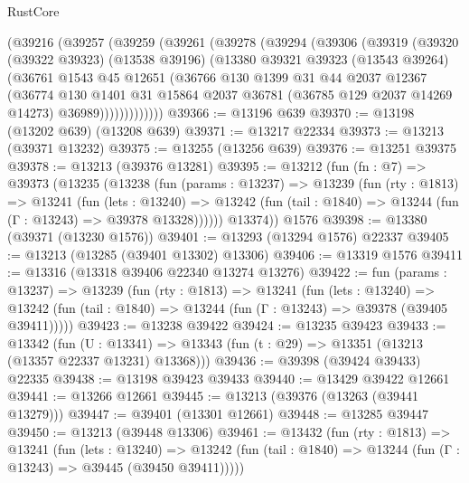 \begin{lexlean}{RustCore}
\begin{coremodule}
    (@39216
      (@39257
        (@39259
          (@39261
            (@39278
              (@39294
                (@39306
                  (@39319
                    (@39320
                      (@39322 @39323)
                      (@13538 @39196)
                      (@13380
                        @39321
                        @39323
                        (@13543 @39264)
                        (@36761
                          @1543
                          @45
                          @12651
                          (@36766
                            @130
                            @1399
                            @31
                            @44
                            @2037
                            @12367
                            (@36774
                              @130
                              @1401
                              @31
                              @15864
                              @2037
                              @36781
                              (@36785 @129 @2037 @14269 @14273)
                              @36989)))))))))))))
@39366 := @13196 @639
@39370 := @13198 (@13202 @639) (@13208 @639)
@39371 := @13217 @22334
@39373 := @13213 (@39371 @13232)
@39375 := @13255 (@13256 @639)
@39376 := @13251 @39375
@39378 := @13213 (@39376 @13281)
@39395 := @13212
    (fun (fn : @7) =>
    @39373
      (@13235
        (@13238
          (fun (params : @13237) =>
          @13239
            (fun (rty : @1813) =>
            @13241
              (fun (lets : @13240) =>
              @13242 (fun (tail : @1840) => @13244 (fun (Γ : @13243) => @39378 @13328))))))
        @13374))
    @1576
@39398 := @13380 (@39371 (@13230 @1576))
@39401 := @13293 (@13294 @1576) @22337
@39405 := @13213 (@13285 (@39401 @13302) @13306)
@39406 := @13319 @1576
@39411 := @13316 (@13318 @39406 @22340 @13274 @13276)
@39422 := fun (params : @13237) =>
  @13239
    (fun (rty : @1813) =>
    @13241
      (fun (lets : @13240) =>
      @13242 (fun (tail : @1840) => @13244 (fun (Γ : @13243) => @39378 (@39405 @39411)))))
@39423 := @13238 @39422
@39424 := @13235 @39423
@39433 := @13342
    (fun (U : @13341) => @13343 (fun (t : @29) => @13351 (@13213 (@13357 @22337 @13231) @13368)))
@39436 := @39398 (@39424 @39433) @22335
@39438 := @13198 @39423 @39433
@39440 := @13429 @39422 @12661
@39441 := @13266 @12661
@39445 := @13213 (@39376 (@13263 (@39441 @13279)))
@39447 := @39401 (@13301 @12661)
@39448 := @13285 @39447
@39450 := @13213 (@39448 @13306)
@39461 := @13432
    (fun (rty : @1813) =>
    @13241
      (fun (lets : @13240) =>
      @13242 (fun (tail : @1840) => @13244 (fun (Γ : @13243) => @39445 (@39450 @39411)))))

\end{coremodule}
\end{lexlean}
